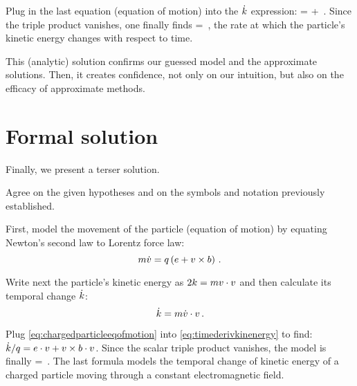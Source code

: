 Plug in the last equation (equation of motion) into the $\dot{k}$ expression:
%
\beq
  \dt\ekin = \echarge\efield\iprod\vel + \echarge\parth{\vel\cprod\mfield}\iprod\vel\,.
\eeq
%
Since the triple product vanishes, one finally finds
%
\beq
  \dt\ekin = \echarge\efield\iprod\vel\,,
\eeq
%
the rate at which the particle's kinetic energy changes with respect to time.

This (analytic) solution confirms our guessed model and the approximate solutions. Then, it creates confidence, not only on our intuition, but also on the efficacy of approximate methods.


\section{Formal solution}
%
Finally, we present a terser solution.

Agree on the given hypotheses and on the symbols and notation previously established.

First, model the movement of the particle (equation of motion) by equating Newton's second law to Lorentz force law:
%
\begin{equation}\label{eq:chargedparticleeqofmotion}
  m\dot{v} = q\left({e + v\times b}\right)\,.
\end{equation}

Write next the particle's kinetic energy as $2k = mv\cdot v$ and then calculate its temporal change $\dot{k}$:
%
\begin{equation}\label{eq:timederivkinenergy}
  \dot{k} = m\dot{v}\cdot v\,.
\end{equation}

Plug \cref{eq:chargedparticleeqofmotion} into \cref{eq:timederivkinenergy} to find: $\dot{k}/q = e\cdot v + v\times b\cdot v$. Since the scalar triple product vanishes, the model is finally
%
\beq
  \dt\ekin = \echarge\efield\iprod\vel\,.
\eeq
%
The last formula models the temporal change of kinetic energy of a charged particle moving through a constant electromagnetic field.

